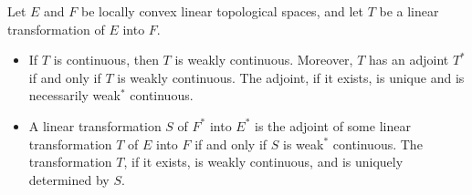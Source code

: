 \begin{theorem}
\label{thm:21.5}
Let $E$ and $F$ be locally convex linear topological spaces, and let $T$ be a linear transformation of $E$ into $F$.

\begin{itemize}
\item[(i)] If $T$ is continuous, then $T$ is weakly continuous. Moreover, $T$ has an adjoint $T^*$ if and only if $T$ is weakly continuous. The adjoint, if it exists, is unique and is necessarily weak$^*$ continuous.

\item[(ii)] A linear transformation $S$ of $F^*$ into $E^*$ is the adjoint of some linear transformation $T$ of $E$ into $F$ if and only if $S$ is weak$^*$ continuous. The transformation $T$, if it exists, is weakly continuous, and is uniquely determined by $S$.
\end{itemize}
\end{theorem}
